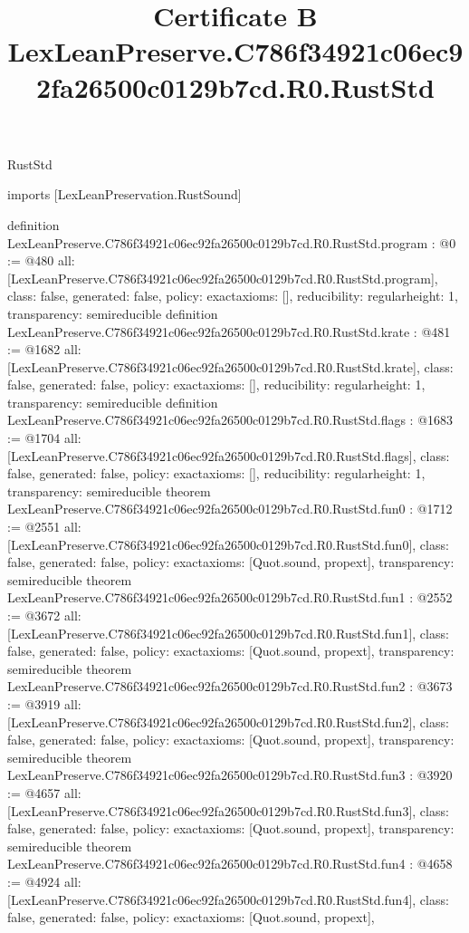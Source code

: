 \begin{lexlean}{RustStd}
\title{Certificate B LexLeanPreserve.C786f34921c06ec92fa26500c0129b7cd.R0.RustStd}
\begin{coremodule}
imports [LexLeanPreservation.RustSound]

definition LexLeanPreserve.C786f34921c06ec92fa26500c0129b7cd.R0.RustStd.program : @0 := @480 {
  all: [LexLeanPreserve.C786f34921c06ec92fa26500c0129b7cd.R0.RustStd.program],
  class: false,
  generated: false,
  policy: exact{axioms: []},
  reducibility: regular{height: 1},
  transparency: semireducible
}
definition LexLeanPreserve.C786f34921c06ec92fa26500c0129b7cd.R0.RustStd.krate : @481 := @1682 {
  all: [LexLeanPreserve.C786f34921c06ec92fa26500c0129b7cd.R0.RustStd.krate],
  class: false,
  generated: false,
  policy: exact{axioms: []},
  reducibility: regular{height: 1},
  transparency: semireducible
}
definition LexLeanPreserve.C786f34921c06ec92fa26500c0129b7cd.R0.RustStd.flags : @1683 := @1704 {
  all: [LexLeanPreserve.C786f34921c06ec92fa26500c0129b7cd.R0.RustStd.flags],
  class: false,
  generated: false,
  policy: exact{axioms: []},
  reducibility: regular{height: 1},
  transparency: semireducible
}
theorem LexLeanPreserve.C786f34921c06ec92fa26500c0129b7cd.R0.RustStd.fun0 : @1712 := @2551 {
  all: [LexLeanPreserve.C786f34921c06ec92fa26500c0129b7cd.R0.RustStd.fun0],
  class: false,
  generated: false,
  policy: exact{axioms: [Quot.sound, propext]},
  transparency: semireducible
}
theorem LexLeanPreserve.C786f34921c06ec92fa26500c0129b7cd.R0.RustStd.fun1 : @2552 := @3672 {
  all: [LexLeanPreserve.C786f34921c06ec92fa26500c0129b7cd.R0.RustStd.fun1],
  class: false,
  generated: false,
  policy: exact{axioms: [Quot.sound, propext]},
  transparency: semireducible
}
theorem LexLeanPreserve.C786f34921c06ec92fa26500c0129b7cd.R0.RustStd.fun2 : @3673 := @3919 {
  all: [LexLeanPreserve.C786f34921c06ec92fa26500c0129b7cd.R0.RustStd.fun2],
  class: false,
  generated: false,
  policy: exact{axioms: [Quot.sound, propext]},
  transparency: semireducible
}
theorem LexLeanPreserve.C786f34921c06ec92fa26500c0129b7cd.R0.RustStd.fun3 : @3920 := @4657 {
  all: [LexLeanPreserve.C786f34921c06ec92fa26500c0129b7cd.R0.RustStd.fun3],
  class: false,
  generated: false,
  policy: exact{axioms: [Quot.sound, propext]},
  transparency: semireducible
}
theorem LexLeanPreserve.C786f34921c06ec92fa26500c0129b7cd.R0.RustStd.fun4 : @4658 := @4924 {
  all: [LexLeanPreserve.C786f34921c06ec92fa26500c0129b7cd.R0.RustStd.fun4],
  class: false,
  generated: false,
  policy: exact{axioms: [Quot.sound, propext]},
}
\end{coremodule}
\end{lexlean}
